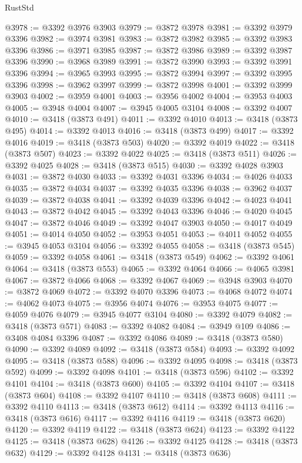 \begin{lexlean}{RustStd}
\begin{coremodule}
@3978 := @3392 @3976 @3903
@3979 := @3872 @3978
@3981 := @3392 @3979 @3396
@3982 := @3974 @3981
@3983 := @3872 @3982
@3985 := @3392 @3983 @3396
@3986 := @3971 @3985
@3987 := @3872 @3986
@3989 := @3392 @3987 @3396
@3990 := @3968 @3989
@3991 := @3872 @3990
@3993 := @3392 @3991 @3396
@3994 := @3965 @3993
@3995 := @3872 @3994
@3997 := @3392 @3995 @3396
@3998 := @3962 @3997
@3999 := @3872 @3998
@4001 := @3392 @3999 @3903
@4002 := @3959 @4001
@4003 := @3956 @4002
@4004 := @3953 @4003
@4005 := @3948 @4004
@4007 := @3945 @4005 @3104
@4008 := @3392 @4007
@4010 := @3418 (@3873 @491)
@4011 := @3392 @4010
@4013 := @3418 (@3873 @495)
@4014 := @3392 @4013
@4016 := @3418 (@3873 @499)
@4017 := @3392 @4016
@4019 := @3418 (@3873 @503)
@4020 := @3392 @4019
@4022 := @3418 (@3873 @507)
@4023 := @3392 @4022
@4025 := @3418 (@3873 @511)
@4026 := @3392 @4025
@4028 := @3418 (@3873 @515)
@4030 := @3392 @4028 @3903
@4031 := @3872 @4030
@4033 := @3392 @4031 @3396
@4034 := @4026 @4033
@4035 := @3872 @4034
@4037 := @3392 @4035 @3396
@4038 := @3962 @4037
@4039 := @3872 @4038
@4041 := @3392 @4039 @3396
@4042 := @4023 @4041
@4043 := @3872 @4042
@4045 := @3392 @4043 @3396
@4046 := @4020 @4045
@4047 := @3872 @4046
@4049 := @3392 @4047 @3903
@4050 := @4017 @4049
@4051 := @4014 @4050
@4052 := @3953 @4051
@4053 := @4011 @4052
@4055 := @3945 @4053 @3104
@4056 := @3392 @4055
@4058 := @3418 (@3873 @545)
@4059 := @3392 @4058
@4061 := @3418 (@3873 @549)
@4062 := @3392 @4061
@4064 := @3418 (@3873 @553)
@4065 := @3392 @4064
@4066 := @4065 @3981
@4067 := @3872 @4066
@4068 := @3392 @4067
@4069 := @3948 @3903
@4070 := @3872 @4069
@4072 := @3392 @4070 @3396
@4073 := @4068 @4072
@4074 := @4062 @4073
@4075 := @3956 @4074
@4076 := @3953 @4075
@4077 := @4059 @4076
@4079 := @3945 @4077 @3104
@4080 := @3392 @4079
@4082 := @3418 (@3873 @571)
@4083 := @3392 @4082
@4084 := @3949 @109
@4086 := @3408 @4084 @3396
@4087 := @3392 @4086
@4089 := @3418 (@3873 @580)
@4090 := @3392 @4089
@4092 := @3418 (@3873 @584)
@4093 := @3392 @4092
@4095 := @3418 (@3873 @588)
@4096 := @3392 @4095
@4098 := @3418 (@3873 @592)
@4099 := @3392 @4098
@4101 := @3418 (@3873 @596)
@4102 := @3392 @4101
@4104 := @3418 (@3873 @600)
@4105 := @3392 @4104
@4107 := @3418 (@3873 @604)
@4108 := @3392 @4107
@4110 := @3418 (@3873 @608)
@4111 := @3392 @4110
@4113 := @3418 (@3873 @612)
@4114 := @3392 @4113
@4116 := @3418 (@3873 @616)
@4117 := @3392 @4116
@4119 := @3418 (@3873 @620)
@4120 := @3392 @4119
@4122 := @3418 (@3873 @624)
@4123 := @3392 @4122
@4125 := @3418 (@3873 @628)
@4126 := @3392 @4125
@4128 := @3418 (@3873 @632)
@4129 := @3392 @4128
@4131 := @3418 (@3873 @636)

\end{coremodule}
\end{lexlean}

